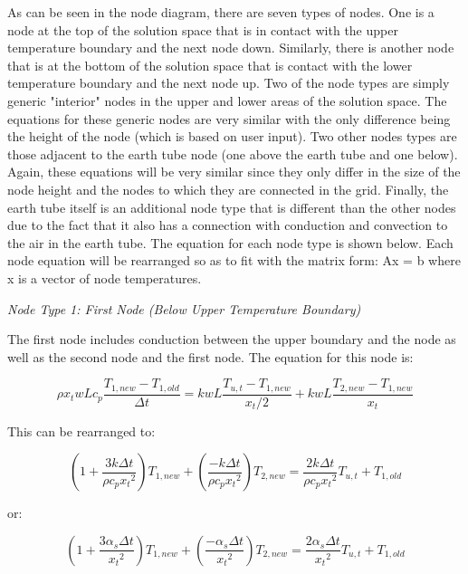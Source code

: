 As can be seen in the node diagram, there are seven types of nodes.  One is a node at the top of the solution space that is in contact with the upper temperature boundary and the next node down.  Similarly, there is another node that is at the bottom of the solution space that is contact with the lower temperature boundary and the next node up.  Two of the node types are simply generic "interior" nodes in the upper and lower areas of the solution space.  The equations for these generic nodes are very similar with the only difference being the height of the node (which is based on user input).  Two other nodes types are those adjacent to the earth tube node (one above the earth tube and one below).  Again, these equations will be very similar since they only differ in the size of the node height and the nodes to which they are connected in the grid.  Finally, the earth tube itself is an additional node type that is different than the other nodes due to the fact that it also has a connection with conduction and convection to the air in the earth tube.  The equation for each node type is shown below.  Each node equation will be rearranged so as to fit with the matrix form: Ax = b where x is a vector of node temperatures.

\emph{\textit{Node Type 1: First Node (Below Upper Temperature Boundary)}}

The first node includes conduction between the upper boundary and the node as well as the second node and the first node.  The equation for this node is:

\begin{equation}
\rho x_t w L c_p \frac{T_{1,new} - T_{1,old}}{\Delta t} = k w L \frac{T_{u,t}-T_{1,new}}{x_t / 2} + k w L \frac{T_{2,new}-T_{1,new}}{x_t}
\end{equation}

This can be rearranged to:

\begin{equation}
(1 + \frac{3 k \Delta t}{\rho c_p {x_t}^2}) T_{1,new} + (\frac{-k \Delta t}{\rho c_p {x_t}^2}) T_{2,new} = \frac{2 k \Delta t}{\rho c_p {x_t}^2} T_{u,t} + T_{1,old}
\end{equation}

or:

\begin{equation}
(1 + \frac{3 \alpha_s \Delta t}{{x_t}^2}) T_{1,new} + (\frac{-\alpha_s \Delta t}{{x_t}^2}) T_{2,new} = \frac{2 \alpha_s \Delta t}{{x_t}^2} T_{u,t} + T_{1,old}
\end{equation}


